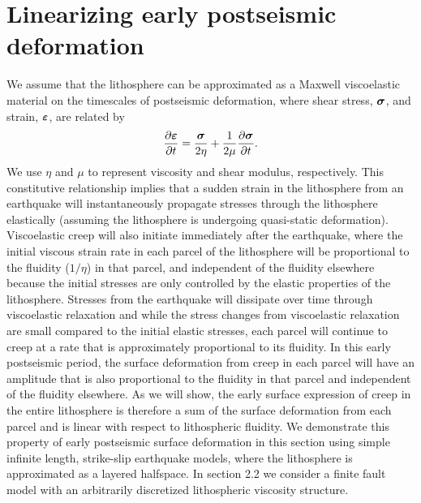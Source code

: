 \documentclass[extra,mreferee]{gji}
\begin{document}
\section{Linearizing early postseismic deformation} 
We assume that the lithosphere can be approximated as a Maxwell
viscoelastic material on the timescales of postseismic deformation,
where shear stress, $\mitbf{\sigma}$, and strain,
$\mitbf{\varepsilon}$, are related by
\begin{equation}
  \frac{\partial\mitbf{\varepsilon}}{\partial t}=\frac{\mitbf{\sigma}}{2\eta} + 
                              \frac{1}{2\mu}\frac{\partial\mitbf{\sigma}}{\partial t}.
\end{equation}
We use $\eta$ and $\mu$ to represent viscosity and shear modulus,
respectively.  This constitutive relationship implies that a sudden
strain in the lithosphere from an earthquake will instantaneously
propagate stresses through the lithosphere elastically (assuming the
lithosphere is undergoing quasi-static deformation).  Viscoelastic
creep will also initiate immediately after the earthquake, where the
initial viscous strain rate in each parcel of the lithosphere will be
proportional to the fluidity ($1/\eta$) in that parcel, and
independent of the fluidity elsewhere because the initial stresses are
only controlled by the elastic properties of the lithosphere.
Stresses from the earthquake will dissipate over time through
viscoelastic relaxation and while the stress changes from viscoelastic
relaxation are small compared to the initial elastic stresses, each
parcel will continue to creep at a rate that is approximately
proportional to its fluidity.  In this early postseismic period, the
surface deformation from creep in each parcel will have an amplitude
that is also proportional to the fluidity in that parcel and
independent of the fluidity elsewhere.  As we will show, the early
surface expression of creep in the entire lithosphere is therefore a
sum of the surface deformation from each parcel and is linear with
respect to lithospheric fluidity.  We demonstrate this property of
early postseismic surface deformation in this section using simple
infinite length, strike-slip earthquake models, where the lithosphere
is approximated as a layered halfspace. In section 2.2 we consider a
finite fault model with an arbitrarily discretized lithospheric
viscosity structure.
\end{document}
